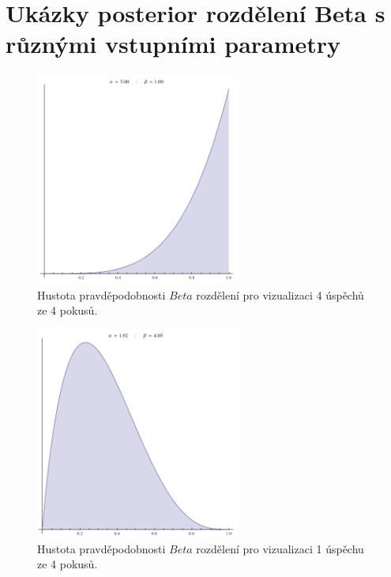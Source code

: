 \documentclass[thesis=M,czech]{FITthesis}[2014/05/07]
\begin{document}
\chapter{Ukázky posterior rozdělení Beta s různými vstupními parametry}

\begin{figure}\centering
	\includegraphics[width=0.6\textwidth]{obr/beta1.png}
 	\caption[Hustota pravděpodobnosti $Beta$ rozdělení pro vizualizaci 4 úspěchů ze 4 pokusů.]{Hustota pravděpodobnosti $Beta$ rozdělení pro vizualizaci 4 úspěchů ze 4 pokusů.}\label{fig:beta1}
\end{figure}	

\begin{figure}\centering
	\includegraphics[width=0.6\textwidth]{obr/beta2.png}
 	\caption[Hustota pravděpodobnosti $Beta$ rozdělení pro vizualizaci 1 úspěchu ze 4 pokusů.]{Hustota pravděpodobnosti $Beta$ rozdělení pro vizualizaci 1 úspěchu ze 4 pokusů.}\label{fig:beta2}
\end{figure}	
\end{document}
